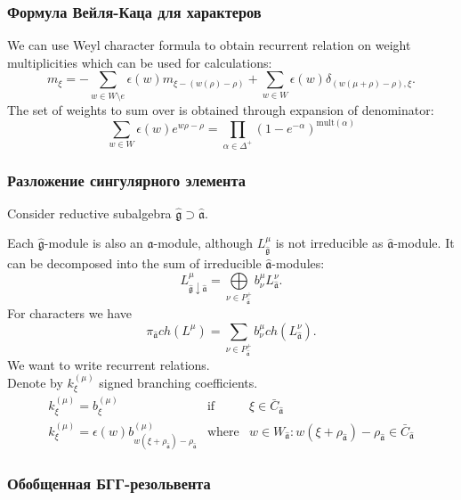 \documentclass[pdftex]{beamer}
\newcommand{\gfh}{\hat{\mathfrak{g}}}
\newcommand{\afh}{\hat{\mathfrak{a}}}
\theoremstyle{definition} \newtheorem{Def}{Definition}
\begin{document}
\begin{frame}
  \frametitle{Формула Вейля-Каца для характеров}
  We can use Weyl character formula to obtain recurrent relation on weight multiplicities which can be used for calculations:
  \begin{equation}
    \label{eq:14}
    m_{\xi }=-\sum_{w\in W\setminus e}\epsilon (w)m_{\xi
      -\left( w(\rho )-\rho \right) }+\sum_{w\in W}\epsilon
    (w)\delta _{\left( w(\mu +\rho )-\rho \right) ,\xi }.
  \end{equation}
  The set of weights to sum over is obtained through expansion of denominator:
  \begin{equation*}
    \sum_{w\in W}\epsilon(w) e^{w\rho-\rho}=\prod_{\alpha\in \Delta^{+}}\left(1-e^{-\alpha}\right)^{\mathrm{mult}(\alpha)}
  \end{equation*}
\end{frame}
\begin{frame}
  \frametitle{Разложение сингулярного элемента}
  Consider reductive subalgebra $\gfh \supset \afh$. 

  Each $\gfh$-module is also an $\afh$-module, although
  $L^{\mu}_{\gfh}$ is not irreducible as $\afh$-module. It can be
  decomposed into the sum of irreducible $\afh$-modules:
  \begin{equation*}
    L_{\gfh \downarrow \afh}^{\mu }=\bigoplus\limits_{\nu \in P_{\afh}^{+}}b_{\nu }^{\mu}L_{\afh}^{\nu }.
  \end{equation*}
  For characters we have
  \begin{equation*}
    \pi _{\afh}ch\left( L^{\mu }\right) =\sum_{\nu \in P_{\afh}^{+}}b_{\nu }^{\mu}ch\left( L_{\afh}^{\nu }\right) .
\label{branching1}
\end{equation*}
We want to write recurrent relations.\\
  Denote by  $k_{\xi }^{\left( \mu \right) }$ signed branching coefficients.
  \begin{equation*}
    \begin{array}{lll}
     k_{\xi}^{(\mu)}=b^{(\mu)}_{\xi} & \text{if} & \xi\in \bar C_{\afh}\\
     k_{\xi}^{(\mu)}=\epsilon(w) b^{(\mu)}_{w (\xi+\rho_{\afh})-\rho_{\afh}} & \text{where} &w\in W_{\afh} : w (\xi+\rho_{\afh})-\rho_{\afh}\in \bar C_{\afh}
    \end{array}
  \end{equation*}

\end{frame}

\begin{frame}
  \frametitle{Обобщенная БГГ-резольвента}
  
\end{frame}
\end{document}
